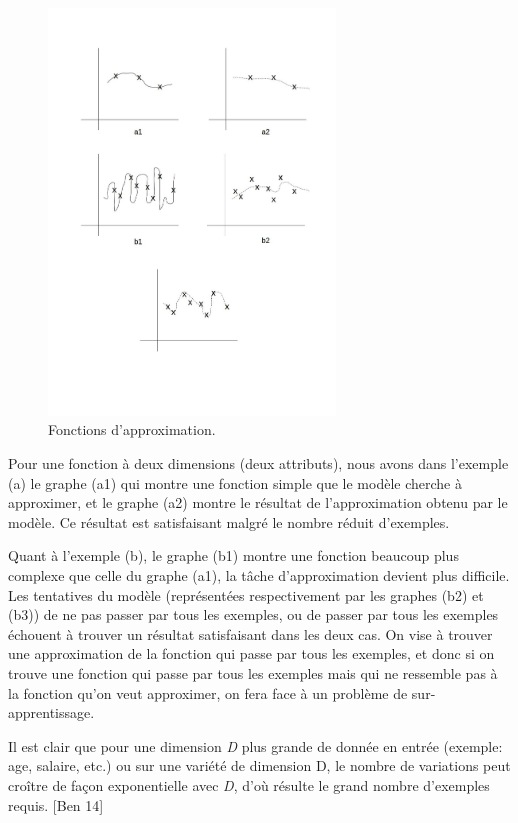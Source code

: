 \begin{figure}[H]
	\centering
		\includegraphics[width=3in]{Figures/highVariation.jpg}
	\caption[FA]{Fonctions d'approximation.}
	\label{fig:Electron}
\end{figure}


	Pour une fonction à deux dimensions (deux attributs), nous avons dans l'exemple (a) le graphe (a1) qui montre une fonction simple que le modèle cherche à approximer, et le graphe (a2) montre le résultat de l'approximation obtenu par le modèle. Ce résultat est satisfaisant malgré le nombre réduit d'exemples.

	Quant à l'exemple (b), le graphe (b1) montre une fonction beaucoup plus complexe que celle du graphe (a1), la tâche d'approximation devient plus difficile. Les tentatives du modèle (représentées respectivement par les graphes (b2) et (b3)) de ne pas passer par tous les exemples, ou de passer par tous les exemples échouent à trouver un résultat satisfaisant dans les deux cas. On vise à trouver une approximation de la fonction qui passe par tous les exemples, et donc si on trouve une fonction qui passe par tous les exemples mais qui ne ressemble pas à la fonction qu'on veut approximer, on fera face à un problème de sur-apprentissage.

	Il est clair que pour une dimension \textit{D} plus grande de donnée en entrée (exemple: age, salaire, etc.) ou sur une variété de dimension D, le nombre de variations peut croître de façon exponentielle avec \textit{D}, d'où résulte le grand nombre d'exemples requis. [Ben 14]

